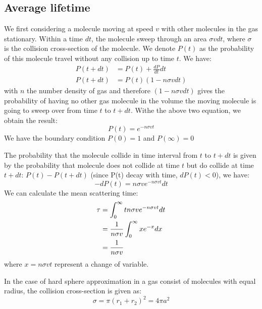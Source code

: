 \documentclass{article}
\begin{document}
\subsection{Average lifetime}
We first considering a molecule moving at speed $v$ with other molecules in
the gas stationary. Within a time $dt$, the molecule sweep through an area $\sigma v dt$,
where $\sigma$ is the collision cross-section of the molecule. We denote $P(t)$ as 
the probability of this molecule travel without any collision up to time $t$. We have:
\begin{align}
    P(t + dt) &= P(t) + \frac{dP}{dt}dt \\
    P(t + dt) &= P(t) (1 - n\sigma v dt) 
\end{align}
with $n$ the number density of gas and therefore $(1 - n\sigma v dt)$ gives the 
probability of having no other gas molecule in the volume the moving molecule is going 
to sweep over from time $t$ to $t + dt$. 
Withe the above two equation, we obtain the result:
\begin{equation}
    P(t) = e^{-n\sigma vt}
\end{equation}
We have the boundary condition $P(0) = 1$ and $P(\infty) = 0$

The probability that the molecule collide in time interval from $t$ to $t+dt$ is given by
the probability that molecule does not collide at time $t$ but do collide at time $t + dt$:
$P(t) - P(t + dt)$ (since P(t) decay with time, $dP(t) < 0$), we have:
\begin{equation}
    - dP(t) = n\sigma v e^{-n\sigma vt} dt
\end{equation}
We can calculate the mean scattering time:
\begin{align}
    \tau &= \int_{0}^{\infty} t n \sigma v e^{-n\sigma vt} dt \notag \\
         &= \frac{1}{n\sigma v} \int_{0}^{\infty} x e^{-x} dx \notag \\
         &= \frac{1}{n\sigma v}
\end{align}
where $x = n\sigma v t$ represent a change of variable.

In the case of hard sphere approximation in a gas consist of molecules with
equal radius, the collision cross-section is given as:
\begin{equation}
    \sigma = \pi (r_1 + r_2) ^ 2 = 4 \pi a^2
\end{equation}
\end{document}
